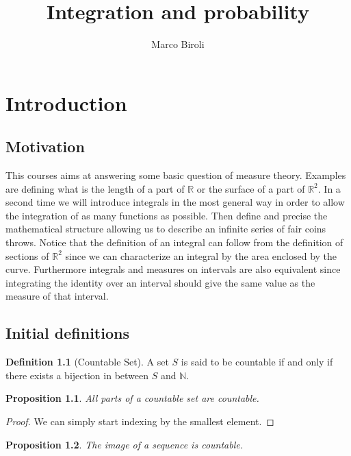 \documentclass[10pt,a4paper]{book}
\author{Marco Biroli}
\title{Integration and probability}
\newtheorem{proposition}{Proposition}[section]
\theoremstyle{definition}
\newtheorem{definition}{Definition}[section]
\begin{document}
\maketitle

\tableofcontents

\chapter{Introduction}
\section{Motivation}
This courses aims at answering some basic question of measure theory. Examples are defining what is the length of a part of $\mathbb{R}$ or the surface of a part of $\mathbb{R}^2$. In a second time we will introduce integrals in the most general way in order to allow the integration of as many functions as possible. Then define and precise the mathematical structure allowing us to describe an infinite series of fair coins throws. Notice that the definition of an integral can follow from the definition of sections of $\mathbb{R}^2$ since we can characterize an integral by the area enclosed by the curve. Furthermore integrals and measures on intervals are also equivalent since integrating the identity over an interval should give the same value as the measure of that interval.

\section{Initial definitions}

\begin{definition}[Countable Set]
A set $S$ is said to be countable if and only if there exists a bijection in between $S$ and $\mathbb{N}$.
\end{definition}

\begin{proposition}
All parts of a countable set are countable.
\end{proposition}

\begin{proof}
We can simply start indexing by the smallest element.
\end{proof}

\begin{proposition}

The image of a sequence is countable.

\end{proposition}
\end{document}
